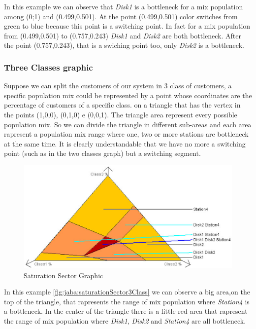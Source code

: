 In this example we can observe that \emph{Disk1} is a bottleneck for a mix population
among (0;1) and (0.499,0.501). At the point (0.499,0.501) color switches from green to blue because 
this point is a switching point. In fact for a mix population from (0.499,0.501) to (0.757,0.243) 
\emph{Disk1} and \emph{Disk2} are both bottleneck. After the point (0.757,0.243), that is a swiching 
point too, only \emph{Disk2} is a bottleneck.


\subsubsection{Three Classes graphic}

Suppose we can split the customers of our system in 3 class of customers, a specific population mix could be represented by a point whose coordinates are the percentage of customers of a specific class.
on a triangle that has the vertex in the points (1,0,0), (0,1,0) e (0,0,1). The triangle area represent every possible population mix. So we can divide the triangle in different sub-areas and each area
rapresent a population mix range where one, two or more stations are bottleneck at the same time.
It is clearly understandable that we have no more a switching point (such as in the two classes graph) 
but a switching segment.
\begin{figure}[htbp]
    \begin{center}
        \includegraphics[scale=.5]{img/jaba/saturationSector3Class}
    \end{center}
    \caption{Saturation Sector Graphic}
    \label{fig:jaba:saturationSector3Class}
\end{figure}

In this example \autoref{fig:jaba:saturationSector3Class} we can observe a big area,on the top of the triangle, that rapresents the range of mix population where \emph{Station4} is a bottleneck. In the center of the triangle there is a little red area that rapresent the range of mix population where \emph{Disk1}, \emph{Disk2} and \emph{Station4} are all bottleneck.

